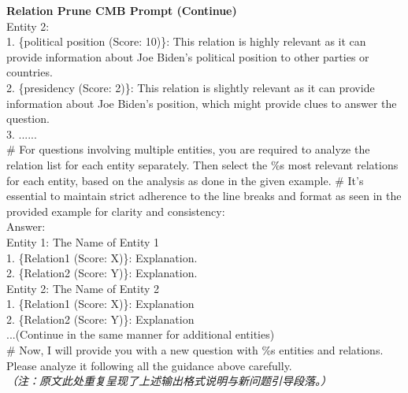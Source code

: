 \documentclass[11pt,UTF8,fontset=fandol]{ctexart}
\begin{document}
\begin{table}[H]\centering
\caption{Relation Prune CMB Prompt (Continue)（组合式关系剪枝提示词，续）。}
\label{tab:17}
\end{table}
\vspace{-1.2em}
\begin{promptbox}
\small
\textbf{Relation Prune CMB Prompt (Continue)}\\
Entity 2:\\
1. \{political position (Score: 10)\}: This relation is highly relevant as it can provide information about Joe Biden's political position to other parties or countries.\\
2. \{presidency (Score: 2)\}: This relation is slightly relevant as it can provide information about Joe Biden's position, which might provide clues to answer the question.\\
3. ......\\[0.3em]
\# For questions involving multiple entities, you are required to analyze the relation list for each entity separately. Then select the \%s most relevant relations for each entity, based on the analysis as done in the given example. \# It's essential to maintain strict adherence to the line breaks and format as seen in the provided example for clarity and consistency:\\
Answer:\\
Entity 1: The Name of Entity 1\\
1. \{Relation1 (Score: X)\}: Explanation.\\
2. \{Relation2 (Score: Y)\}: Explanation.\\[0.2em]
Entity 2: The Name of Entity 2\\
1. \{Relation1 (Score: X)\}: Explanation\\
2. \{Relation2 (Score: Y)\}: Explanation\\
...(Continue in the same manner for additional entities)\\[0.3em]
\# Now, I will provide you with a new question with \%s entities and relations. Please analyze it following all the guidance above carefully.\\
\textit{（注：原文此处重复呈现了上述输出格式说明与新问题引导段落。）}
\end{promptbox}
\end{document}

